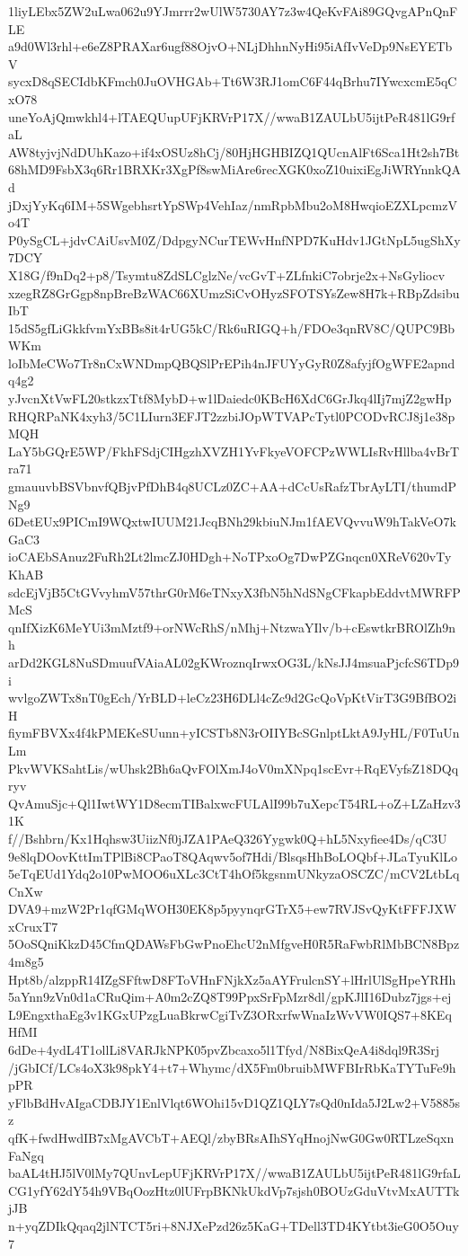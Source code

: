1liyLEbx5ZW2uLwa062u9YJmrrr2wUlW5730AY7z3w4QeKvFAi89GQvgAPnQnFLE
a9d0Wl3rhl+e6eZ8PRAXar6ugf88OjvO+NLjDhhnNyHi95iAfIvVeDp9NsEYETbV
sycxD8qSECIdbKFmch0JuOVHGAb+Tt6W3RJ1omC6F44qBrhu7IYwcxcmE5qCxO78
uneYoAjQmwkhl4+lTAEQUupUFjKRVrP17X//wwaB1ZAULbU5ijtPeR481lG9rfaL
AW8tyjvjNdDUhKazo+if4xOSUz8hCj/80HjHGHBIZQ1QUcnAlFt6Sca1Ht2sh7Bt
68hMD9FsbX3q6Rr1BRXKr3XgPf8swMiAre6recXGK0xoZ10uixiEgJiWRYnnkQAd
jDxjYyKq6IM+5SWgebhsrtYpSWp4VehIaz/nmRpbMbu2oM8HwqioEZXLpcmzVo4T
P0ySgCL+jdvCAiUsvM0Z/DdpgyNCurTEWvHnfNPD7KuHdv1JGtNpL5ugShXy7DCY
X18G/f9nDq2+p8/Tsymtu8ZdSLCglzNe/vcGvT+ZLfnkiC7obrje2x+NsGyliocv
xzegRZ8GrGgp8npBreBzWAC66XUmzSiCvOHyzSFOTSYsZew8H7k+RBpZdsibuIbT
15dS5gfLiGkkfvmYxBBs8it4rUG5kC/Rk6uRIGQ+h/FDOe3qnRV8C/QUPC9BbWKm
loIbMeCWo7Tr8nCxWNDmpQBQSlPrEPih4nJFUYyGyR0Z8afyjfOgWFE2apndq4g2
yJvcnXtVwFL20stkzxTtf8MybD+w1lDaiedc0KBcH6XdC6GrJkq4lIj7mjZ2gwHp
RHQRPaNK4xyh3/5C1LIurn3EFJT2zzbiJOpWTVAPcTytl0PCODvRCJ8j1e38pMQH
LaY5bGQrE5WP/FkhFSdjCIHgzhXVZH1YvFkyeVOFCPzWWLIsRvHllba4vBrTra71
gmauuvbBSVbnvfQBjvPfDhB4q8UCLz0ZC+AA+dCcUsRafzTbrAyLTI/thumdPNg9
6DetEUx9PICmI9WQxtwIUUM21JcqBNh29kbiuNJm1fAEVQvvuW9hTakVeO7kGaC3
ioCAEbSAnuz2FuRh2Lt2lmcZJ0HDgh+NoTPxoOg7DwPZGnqcn0XReV620vTyKhAB
sdcEjVjB5CtGVvyhmV57thrG0rM6eTNxyX3fbN5hNdSNgCFkapbEddvtMWRFPMcS
qnIfXizK6MeYUi3mMztf9+orNWcRhS/nMhj+NtzwaYIlv/b+cEswtkrBROlZh9nh
arDd2KGL8NuSDmuufVAiaAL02gKWroznqIrwxOG3L/kNsJJ4msuaPjcfcS6TDp9i
wvlgoZWTx8nT0gEch/YrBLD+leCz23H6DLl4cZc9d2GcQoVpKtVirT3G9BfBO2iH
fiymFBVXx4f4kPMEKeSUunn+yICSTb8N3rOIIYBcSGnlptLktA9JyHL/F0TuUnLm
PkvWVKSahtLis/wUhsk2Bh6aQvFOlXmJ4oV0mXNpq1scEvr+RqEVyfsZ18DQqryv
QvAmuSjc+Ql1IwtWY1D8ecmTIBalxwcFULAlI99b7uXepcT54RL+oZ+LZaHzv31K
f//Bshbrn/Kx1Hqhsw3UiizNf0jJZA1PAeQ326Yygwk0Q+hL5Nxyfiee4Ds/qC3U
9e8lqDOovKttImTPlBi8CPaoT8QAqwv5of7Hdi/BlsqsHhBoLOQbf+JLaTyuKlLo
5eTqEUd1Ydq2o10PwMOO6uXLc3CtT4hOf5kgsnmUNkyzaOSCZC/mCV2LtbLqCnXw
DVA9+mzW2Pr1qfGMqWOH30EK8p5pyynqrGTrX5+ew7RVJSvQyKtFFFJXWxCruxT7
5OoSQniKkzD45CfmQDAWsFbGwPnoEhcU2nMfgveH0R5RaFwbRlMbBCN8Bpz4m8g5
Hpt8b/alzppR14IZgSFftwD8FToVHnFNjkXz5aAYFrulcnSY+lHrlUlSgHpeYRHh
5aYnn9zVn0d1aCRuQim+A0m2cZQ8T99PpxSrFpMzr8dl/gpKJlI16Dubz7jgs+ej
L9EngxthaEg3v1KGxUPzgLuaBkrwCgiTvZ3ORxrfwWnaIzWvVW0IQS7+8KEqHfMI
6dDe+4ydL4T1ollLi8VARJkNPK05pvZbcaxo5l1Tfyd/N8BixQeA4i8dql9R3Srj
/jGbICf/LCs4oX3k98pkY4+t7+Whymc/dX5Fm0bruibMWFBIrRbKaTYTuFe9hpPR
yFlbBdHvAIgaCDBJY1EnlVlqt6WOhi15vD1QZ1QLY7sQd0nIda5J2Lw2+V5885sz
qfK+fwdHwdIB7xMgAVCbT+AEQl/zbyBRsAIhSYqHnojNwG0Gw0RTLzeSqxnFaNgq
baAL4tHJ5lV0lMy7QUnvLepUFjKRVrP17X//wwaB1ZAULbU5ijtPeR481lG9rfaL
CG1yfY62dY54h9VBqOozHtz0lUFrpBKNkUkdVp7sjsh0BOUzGduVtvMxAUTTkjJB
n+yqZDIkQqaq2jlNTCT5ri+8NJXePzd26z5KaG+TDell3TD4KYtbt3ieG0O5Ouy7
